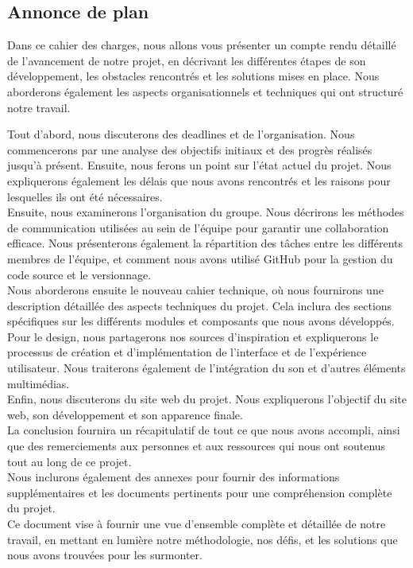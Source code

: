 \subsection{Annonce de plan}

Dans ce cahier des charges, nous allons vous présenter un compte rendu détaillé de l'avancement de notre projet, en décrivant les différentes étapes de son développement, les obstacles rencontrés et les solutions mises en place. Nous aborderons également les aspects organisationnels et techniques qui ont structuré notre travail.
\newline

Tout d'abord, nous discuterons des deadlines et de l'organisation. Nous commencerons par une analyse des objectifs initiaux et des progrès réalisés jusqu'à présent. Ensuite, nous ferons un point sur l'état actuel du projet. Nous expliquerons également les délais que nous avons rencontrés et les raisons pour lesquelles ils ont été nécessaires.
\\

Ensuite, nous examinerons l'organisation du groupe. Nous décrirons les méthodes de communication utilisées au sein de l'équipe pour garantir une collaboration efficace. Nous présenterons également la répartition des tâches entre les différents membres de l'équipe, et comment nous avons utilisé GitHub pour la gestion du code source et le versionnage.
\\

Nous aborderons ensuite le nouveau cahier technique, où nous fournirons une description détaillée des aspects techniques du projet. Cela inclura des sections spécifiques sur les différents modules et composants que nous avons développés.
\\

Pour le design, nous partagerons nos sources d'inspiration et expliquerons le processus de création et d'implémentation de l'interface et de l'expérience utilisateur. Nous traiterons également de l'intégration du son et d'autres éléments multimédias.
\\

Enfin, nous discuterons du site web du projet. Nous expliquerons l'objectif du site web, son développement et son apparence finale.
\\

La conclusion fournira un récapitulatif de tout ce que nous avons accompli, ainsi que des remerciements aux personnes et aux ressources qui nous ont soutenus tout au long de ce projet.
\\

Nous inclurons également des annexes pour fournir des informations supplémentaires et les documents pertinents pour une compréhension complète du projet.
\\

Ce document vise à fournir une vue d'ensemble complète et détaillée de notre travail, en mettant en lumière notre méthodologie, nos défis, et les solutions que nous avons trouvées pour les surmonter.
